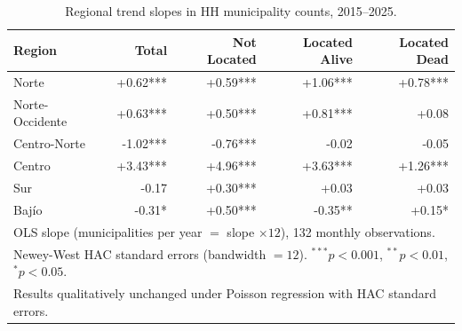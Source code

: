 \begin{table}[htbp]
\caption{Regional trend slopes in HH municipality counts, 2015--2025.}\label{tab:slopes}
\begin{tabular}{lrrrr}
  \toprule
  \textbf{Region} & \textbf{Total} & \textbf{Not Located} & \textbf{Located Alive} & \textbf{Located Dead} \\
  \midrule
  Norte & +0.62*** & +0.59*** & +1.06*** & +0.78*** \\
  Norte-Occidente & +0.63*** & +0.50*** & +0.81*** & +0.08 \\
  Centro-Norte & -1.02*** & -0.76*** & -0.02 & -0.05 \\
  Centro & +3.43*** & +4.96*** & +3.63*** & +1.26*** \\
  Sur & -0.17 & +0.30*** & +0.03 & +0.03 \\
  Bajío & -0.31* & +0.50*** & -0.35** & +0.15* \\
  \bottomrule
  \multicolumn{5}{l}{\footnotesize OLS slope (municipalities per year $=$ slope $\times 12$), 132 monthly observations.} \\
  \multicolumn{5}{l}{\footnotesize Newey-West HAC standard errors (bandwidth $= 12$). $^{***}p<0.001$, $^{**}p<0.01$, $^{*}p<0.05$.} \\
  \multicolumn{5}{l}{\footnotesize Results qualitatively unchanged under Poisson regression with HAC standard errors.} \\
\end{tabular}
\end{table}